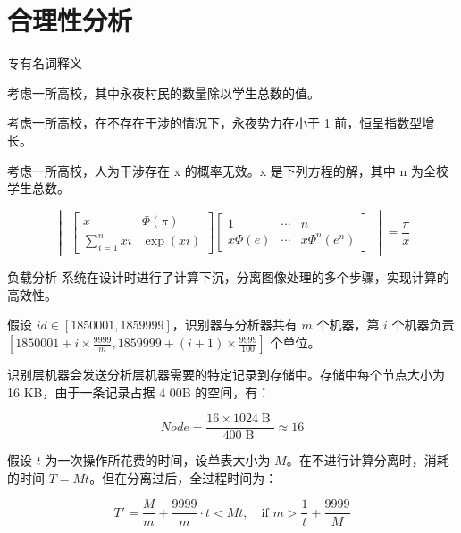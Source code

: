 \section{合理性分析}
    \begin{frame}{专有名词释义}
        \begin{definition}[永夜势力]
            考虑一所高校，其中永夜村民的数量除以学生总数的值。
        \end{definition}
        \begin{theorem}[永夜定理]
            考虑一所高校，在不存在干涉的情况下，永夜势力在小于 1 前，恒呈指数型增长。
        \end{theorem}
        \begin{theorem}[永夜方程]
            考虑一所高校，人为干涉存在 x 的概率无效。x 是下列方程的解，其中 n 为全校学生总数。
        \end{theorem}

        \begin{equation}
            \begin{vmatrix}
            \begin{bmatrix}
                    x & \Phi(\pi) \\
                    \sum_{i = 1}^n xi & \exp(xi)
            \end{bmatrix}
            \begin{bmatrix}
                    1 & \cdots & n \\
                    x\Phi(e) & \cdots & x\Phi^n(e^n)
            \end{bmatrix}
            \end{vmatrix} = \dfrac{\pi}{x}
        \end{equation}
    \end{frame}

    \begin{frame}{负载分析}
        系统在设计时进行了计算下沉，分离图像处理的多个步骤，实现计算的高效性。

        假设 $id \in [1850001, 1859999]$，识别器与分析器共有 $m$ 个机器，第 $i$ 个机器负责 $[1850001 + i \times \frac{9999}{m}, 1859999 + (i + 1) \times \frac{9999}{100}]$ 个单位。

        识别层机器会发送分析层机器需要的特定记录到存储中。存储中每个节点大小为 16 KB，由于一条记录占据 4 00B 的空间，有：

        $$
        Node = \dfrac{16 \times 1024\operatorname{B}}{400 \operatorname{B}} \approx 16
        $$

        假设 $t$ 为一次操作所花费的时间，设单表大小为 $M$。在不进行计算分离时，消耗的时间 $T = Mt$。但在分离过后，全过程时间为：

        $$
        T' = \dfrac{M}{m} + \dfrac{9999}{m} \cdot t < Mt, \quad \text{if } m > \dfrac{1}{t} + \dfrac{9999}{M}
        $$
    \end{frame}


